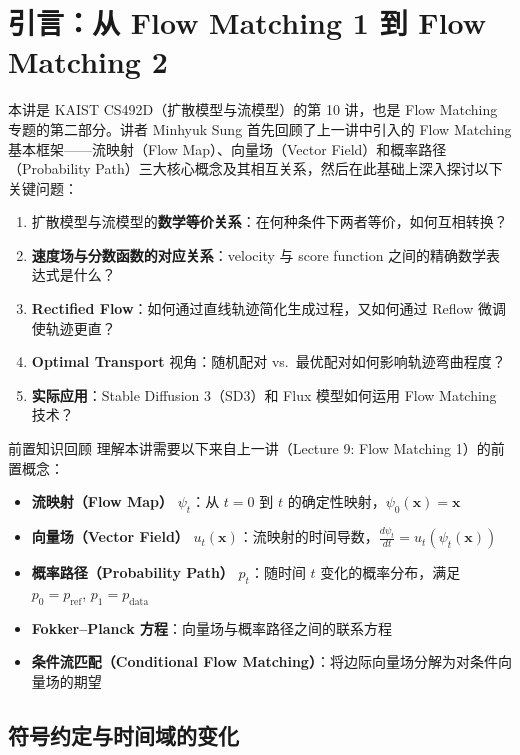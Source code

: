 \section{引言：从 Flow Matching 1 到 Flow Matching 2}

本讲是 KAIST CS492D（扩散模型与流模型）的第 10 讲，也是 Flow Matching 专题的第二部分。讲者 Minhyuk Sung 首先回顾了上一讲中引入的 Flow Matching 基本框架——流映射（Flow Map）、向量场（Vector Field）和概率路径（Probability Path）三大核心概念及其相互关系，然后在此基础上深入探讨以下关键问题：

\begin{enumerate}
    \item 扩散模型与流模型的\textbf{数学等价关系}：在何种条件下两者等价，如何互相转换？
    \item \textbf{速度场与分数函数的对应关系}：velocity 与 score function 之间的精确数学表达式是什么？
    \item \textbf{Rectified Flow}：如何通过直线轨迹简化生成过程，又如何通过 Reflow 微调使轨迹更直？
    \item \textbf{Optimal Transport} 视角：随机配对 vs.\ 最优配对如何影响轨迹弯曲程度？
    \item \textbf{实际应用}：Stable Diffusion 3（SD3）和 Flux 模型如何运用 Flow Matching 技术？
\end{enumerate}

\begin{knowledgebox}{前置知识回顾}
理解本讲需要以下来自上一讲（Lecture 9: Flow Matching 1）的前置概念：
\begin{itemize}
    \item \textbf{流映射（Flow Map）} $\psi_t$：从 $t=0$ 到 $t$ 的确定性映射，$\psi_0(\mathbf{x}) = \mathbf{x}$
    \item \textbf{向量场（Vector Field）} $u_t(\mathbf{x})$：流映射的时间导数，$\frac{d\psi_t}{dt} = u_t(\psi_t(\mathbf{x}))$
    \item \textbf{概率路径（Probability Path）} $p_t$：随时间 $t$ 变化的概率分布，满足 $p_0 = p_{\text{ref}}$, $p_1 = p_{\text{data}}$
    \item \textbf{Fokker--Planck 方程}：向量场与概率路径之间的联系方程
    \item \textbf{条件流匹配（Conditional Flow Matching）}：将边际向量场分解为对条件向量场的期望
\end{itemize}
\end{knowledgebox}

\subsection{符号约定与时间域的变化}

